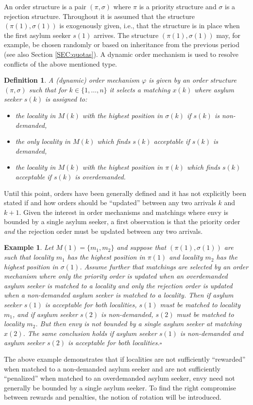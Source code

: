 \documentclass[12pt,fleqn]{article}
\newtheorem{definition}{Definition}
\newtheorem{example}{Example}
\begin{document}
An order structure is a pair $(\pi,\sigma)$ where $\pi$ is a priority structure and $\sigma$ is a rejection structure. Throughout it is assumed that the structure $(\pi(1),\sigma(1))$ is exogenously given, i.e., that the structure is in place when the first asylum seeker $s(1)$ arrives. The structure $(\pi(1),\sigma(1))$ may, for example, be chosen randomly or based on inheritance from the previous period (see also Section \ref{SEC:quotas}). A dynamic order mechanism is used to resolve conflicts of the above mentioned type.
\begin{definition}\rm\label{DEF:Structure_Mechanism}
A (dynamic) order mechanism $\varphi$ is given by an order structure $(\pi,\sigma)$ such that for $k\in\{1,\ldots,n\}$ it selects a matching $x(k)$ where asylum seeker $s(k)$ is assigned to:
\begin{itemize}
\item[(i)] the locality in $M(k)$ with the highest position in $\sigma(k)$ if $s(k)$ is non-demanded,
\item[(ii)] the only locality in $M(k)$ which finds $s(k)$ acceptable if $s(k)$ is demanded,
\item[(iii)] the locality in $M(k)$ with the highest position in $\pi(k)$ which finds $s(k)$ acceptable if $s(k)$ is overdemanded.
\end{itemize}
\end{definition}
\noindent Until this point, orders have been generally defined and it has not explicitly been stated if and how orders should be ``updated'' between any two arrivals $k$ and $k+1$. Given the interest in order mechanisms and matchings where envy is bounded by a single asylum seeker, a first observation is that the priority order \emph{and} the rejection order must be updated between any two arrivals.
\begin{example}\rm
Let $M(1)=\{m_1,m_2\}$ and suppose that $(\pi(1),\sigma(1))$ are such that locality $m_1$ has the highest position in $\pi(1)$ and locality $m_2$ has the highest position in $\sigma(1)$. Assume further that matchings are selected by an order mechanism where \emph{only} the priority order is updated when an overdemanded asylum seeker is matched to a locality and \emph{only} the rejection order is updated when a non-demanded asylum seeker is matched to a locality. Then if asylum seeker $s(1)$ is acceptable for both localities, $s(1)$ must be matched to locality $m_1$, and if asylum seeker $s(2)$ is non-demanded, $s(2)$ must be matched to locality $m_2$. But then envy is not bounded by a single asylum seeker at matching $x(2)$. The same conclusion holds if asylum seeker $s(1)$ is non-demanded and asylum seeker $s(2)$ is acceptable for both localities.\hfill$\square$
\end{example}
\noindent The above example demonstrates that if localities are not sufficiently ``rewarded'' when matched to a non-demanded asylum seeker and are not sufficiently ``penalized'' when matched to an overdemanded asylum seeker, envy need not generally be bounded by a single asylum seeker. To find the right compromise between rewards and penalties, the notion of rotation will be introduced.
\end{document}
